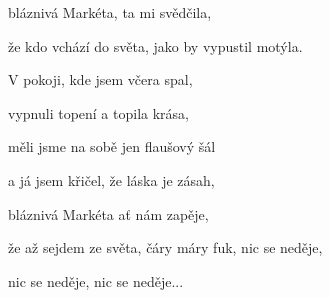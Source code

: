 bláznivá Markéta, ta mi svědčila,

že kdo vchází do světa, jako by vypustil motýla.
\ks

\zr \kr


\zs
V pokoji, kde jsem včera spal,

vypnuli topení a topila krása,

měli jsme na sobě jen flaušový šál

a já jsem křičel, že láska je zásah,

bláznivá Markéta ať nám zapěje,

že až sejdem ze světa, čáry máry fuk, nic se neděje,

nic se neděje, nic se neděje...
\ks

\kp






